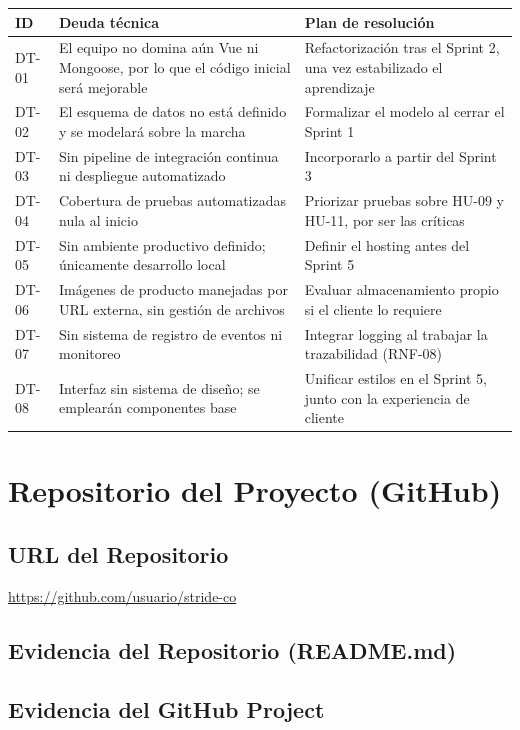 \documentclass[12pt, a4paper]{article}
\begin{document}
\begin{longtable}{@{}p{1.4cm}p{6.8cm}p{6.2cm}@{}}
\toprule
\textbf{ID} & \textbf{Deuda técnica} & \textbf{Plan de resolución} \\
\midrule
\endhead
DT-01 & El equipo no domina aún Vue ni Mongoose, por lo que el código inicial será mejorable & Refactorización tras el Sprint 2, una vez estabilizado el aprendizaje \\
DT-02 & El esquema de datos no está definido y se modelará sobre la marcha & Formalizar el modelo al cerrar el Sprint 1 \\
DT-03 & Sin pipeline de integración continua ni despliegue automatizado & Incorporarlo a partir del Sprint 3 \\
DT-04 & Cobertura de pruebas automatizadas nula al inicio & Priorizar pruebas sobre HU-09 y HU-11, por ser las críticas \\
DT-05 & Sin ambiente productivo definido; únicamente desarrollo local & Definir el hosting antes del Sprint 5 \\
DT-06 & Imágenes de producto manejadas por URL externa, sin gestión de archivos & Evaluar almacenamiento propio si el cliente lo requiere \\
DT-07 & Sin sistema de registro de eventos ni monitoreo & Integrar logging al trabajar la trazabilidad (RNF-08) \\
DT-08 & Interfaz sin sistema de diseño; se emplearán componentes base & Unificar estilos en el Sprint 5, junto con la experiencia de cliente \\
\bottomrule
\end{longtable}


\section{Repositorio del Proyecto (GitHub)}

\subsection{URL del Repositorio}
\url{https://github.com/usuario/stride-co}

\subsection{Evidencia del Repositorio (README.md)}

\subsection{Evidencia del GitHub Project}
\end{document}
